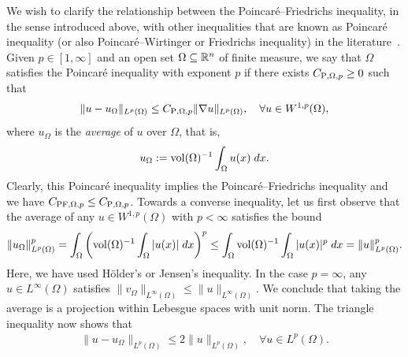 \documentclass[10pt,letterpaper]{article}
\begin{document}
We wish to clarify the relationship between the Poincar\'e--Friedrichs inequality, in the sense introduced above, with other inequalities that are known as Poincar\'e inequality (or also Poincar\'e--Wirtinger or Friedrichs inequality) in the literature~\cite{ern2021finite}. Given $p \in [1,\infty]$ and an open set $\Omega \subseteq {\mathbb R}^{n}$ of finite measure, 
we say that $\Omega$ satisfies the Poincar\'e inequality with exponent $p$ 
if there exists $C_{{{\rm P}},\Omega,p} \geq 0$ such that 
\begin{align*}
    \| u - u_{\Omega} \|_{L^{p}(\Omega)}
    \leq 
    C_{{\rm P},\Omega,p} 
    \| \nabla u \|_{L^{p}(\Omega)}
    ,
    \quad 
    \forall u \in W^{1,p}(\Omega)
    ,
\end{align*}
where $u_{\Omega}$ is the \emph{average} of $u$ over $\Omega$, that is,
\begin{align*}
    u_{\Omega} := \operatorname{vol}(\Omega)^{-1} \int_{\Omega} u(x) \;dx.
\end{align*}
Clearly, this Poincar\'e inequality implies the Poincar\'e--Friedrichs inequality and we have $C_{{\rm{PF}},\Omega,p} \leq C_{{\rm P},\Omega,p}$. 
Towards a converse inequality, 
let us first observe that the average of any $u \in W^{1,p}(\Omega)$ with $p < \infty$ satisfies the bound 
\begin{align*}
    \| u_\Omega \|_{L^{p}(\Omega)}^{p}
    = 
    \int_{\Omega} \left( \operatorname{vol}(\Omega)^{-1} \int_{\Omega} |u(x)| \;dx \right)^{p}
    \leq 
    \int_{\Omega} \operatorname{vol}(\Omega)^{-1} \int_{\Omega} |u(x)|^{p} \;dx
    = 
    \| u \|_{L^{p}(\Omega)}^{p}
    .
\end{align*}
Here, we have used H\"older's or Jensen's inequality. 
In the case $p = \infty$, any $u \in L^{\infty}(\Omega)$ satisfies $\| v_\Omega \|_{L^{\infty}(\Omega)} \leq \| u \|_{L^{\infty}(\Omega)}$. 
We conclude that taking the average is a projection within Lebesgue spaces with unit norm. 
The triangle inequality now shows that 
\begin{align*}
    \| u - u_\Omega \|_{L^{p}(\Omega)} 
    \leq
    2
    \| u \|_{L^{p}(\Omega)},
    \quad 
    \forall
    u \in L^{p}(\Omega)
    .
\end{align*}
\end{document}
